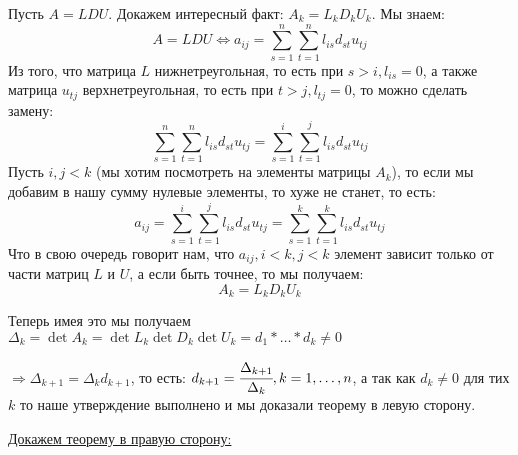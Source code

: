     Пусть $A  = LDU$.  Докажем интересный факт:  $A_k = L_k D_k U_k$. Мы знаем:
    $$A = LDU \Leftrightarrow a_{ij} = \sum\limits_{s =1 }^n \sum\limits_{t=1}^n l_{is}d_{st} u_{tj}$$
    Из того, что матрица $L$ нижнетреугольная, то есть при $s> i , l_{is} = 0$, а также матрица $u_{tj}$ верхнетреугольная, то есть при $t>j, l_{tj}=0$, то можно сделать замену:
    $$\sum\limits_{s =1 }^n \sum\limits_{t=1}^n l_{is}d_{st} u_{tj} = \sum\limits_{s =1 }^i \sum\limits_{t=1}^j l_{is}d_{st} u_{tj}$$
    Пусть $i,j < k$ (мы хотим посмотреть на элементы матрицы $A_k$), то если мы добавим в нашу сумму нулевые элементы, то хуже не станет, то есть:
    $$a_{ij} =  \sum\limits_{s =1 }^i \sum\limits_{t=1}^j l_{is}d_{st} u_{tj} = \sum\limits_{s =1 }^k \sum\limits_{t=1}^k l_{is}d_{st} u_{tj}$$
    Что в свою очередь говорит нам, что $a_{ij}, i<k,j<k$ элемент зависит только  от части матриц $L$ и $U$, а если быть точнее, то мы получаем:
    $$A_k = L_k D_k U_k$$

    Теперь имея это мы получаем $\Delta_k = \det A_k = \det L_k \det D_k \det U_k = d_1 * \ldots * d_k \neq 0$

    $\Rightarrow \Delta_{k+1} = \Delta_k d_{k+1}$, то есть: $d_{k+1} = \cfrac{\Delta_{k+1}}{\Delta_k}, k = 1,\ldots, n$, а так как $d_k\neq 0 $ для 
    тих $k$ то наше утверждение выполнено и мы доказали теорему в левую сторону.

    \uline{Докажем теорему в правую сторону:}

